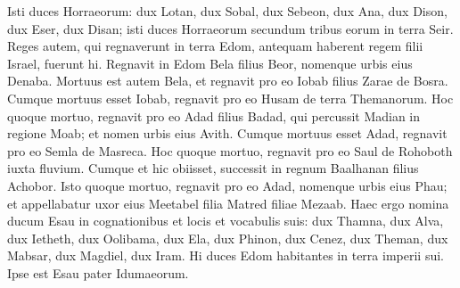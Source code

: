 \begin{biblechapter}
\verse Isti duces Horraeorum: dux Lotan, dux Sobal, dux Sebeon, dux Ana, 
\verse dux Dison, dux Eser, dux Disan; isti duces Horraeorum secundum tribus eorum in terra Seir. 
\verse Reges autem, qui regnaverunt in terra Edom, antequam haberent regem filii Israel, fuerunt hi. 
\verse Regnavit in Edom Bela filius Beor, nomenque urbis eius Denaba. 
\verse Mortuus est autem Bela, et regnavit pro eo Iobab filius Zarae de Bosra. 
\verse Cumque mortuus esset Iobab, regnavit pro eo Husam de terra Themanorum. 
\verse Hoc quoque mortuo, regnavit pro eo Adad filius Badad, qui percussit Madian in regione Moab; et nomen urbis eius Avith. 
\verse Cumque mortuus esset Adad, regnavit pro eo Semla de Masreca. 
\verse Hoc quoque mortuo, regnavit pro eo Saul de Rohoboth iuxta fluvium. 
\verse Cumque et hic obiisset, successit in regnum Baalhanan filius Achobor. 
\verse Isto quoque mortuo, regnavit pro eo Adad, nomenque urbis eius Phau; et appellabatur uxor eius Meetabel filia Matred filiae Mezaab. 
\verse Haec ergo nomina ducum Esau in cognationibus et locis et vocabulis suis: dux Thamna, dux Alva, dux Ietheth, 
\verse dux Oolibama, dux Ela, dux Phinon, 
\verse dux Cenez, dux Theman, dux Mabsar, 
\verse dux Magdiel, dux Iram. Hi duces Edom habitantes in terra imperii sui. Ipse est Esau pater Idumaeorum. 
\end{biblechapter}

